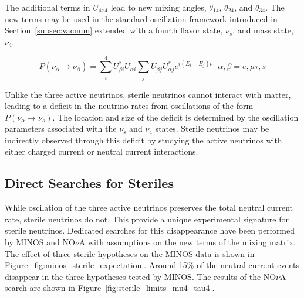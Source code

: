The additional terms in $U_{4x4}$ lead to new mixing angles, $\theta_{14}$, $\theta_{24}$, and $\theta_{34}$.
The new terms may be used in the standard oscillation framework introduced in Section~\ref{subsec:vacuum} extended with a fourth flavor state, ${\nu_s}$, and mass state, ${\nu_4}$.

\begin{equation}
P\left(\nu_\alpha\rightarrow\nu_\beta\right) =  \sum_i^{4} U^*_{\beta i} U_{\alpha i} \sum_j U_{\beta j} U^*_{\alpha j} e^{i \left(E_i-E_j\right) t} \ \ \ \alpha,\beta = e,\mu\tau,s
\label{eqn:sterile_pmns_probability_expanded}
\end{equation}

Unlike the three active neutrinos, sterile neutrinos cannot interact with matter, leading to a deficit in the neutrino rates from oscillations of the form ${P\left(\nu_\alpha\rightarrow\nu_s\right)}$.
The location and size of the deficit is determined by the oscillation parameters associated with the ${\nu_s}$ and ${\nu_4}$ states.
Sterile neutrinos may be indirectly observed through this deficit by studying the active neutrinos with either charged current or neutral current interactions.

\subsection{Direct Searches for Steriles}
While oscilation of the three active neutrinos preserves the total neutral current rate, sterile neutrinos do not.
This provide a unique experimental signature for sterile neutrinos.
Dedicated searches for this disappearance have been performed by MINOS \cite{MINOS-SterileNC-2011,MINOS-SterileNC-2016} and NO${\nu}$A \cite{NOvA-SterileNC} with assumptions on the new terms of the mixing matrix.
The effect of three sterile hypotheses on the MINOS data is shown in Figure~\ref{fig:minos_sterile_expectation}. 
Around 15\% of the neutral current events disappear in the three hypotheses tested by MINOS.
The results of the NO${\nu}$A search are shown in Figure~\ref{fig:sterile_limits_mu4_tau4}.

